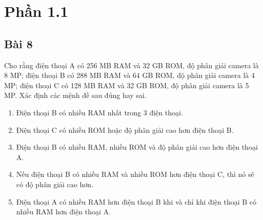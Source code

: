\section*{Phần 1.1}
\subsection*{Bài 8}
Cho rằng điện thoại A có 256 MB RAM và 32 GB ROM, độ phân giải camera là 8 MP; điện thoại B có 288 MB RAM và 64 GB ROM, độ phân giải camera là 4 MP; điện thoại C có 128 MB RAM và 32 GB ROM, độ phân giải camera là 5 MP. Xác định các mệnh đề sau đúng hay sai.
\begin{enumerate}[label=\alph*)]
    \item Điện thoại B có nhiều RAM nhất trong 3 điện thoại.
    \item Điện thoại C có nhiều ROM hoặc độ phân giải cao hơn điện thoại B.
    \item Điện thoại B có nhiều RAM, nhiều ROM và độ phân giải cao hơn điện thoại A.
    \item Nếu điện thoại B có nhiều RAM và nhiều ROM hơn điện thoại C, thì nó sẽ có độ phân giải cao hơn.
    \item Điện thoại A có nhiều RAM hơn điện thoại B khi và chỉ khi điện thoại B có nhiều RAM hơn điện thoại A.
\end{enumerate}
